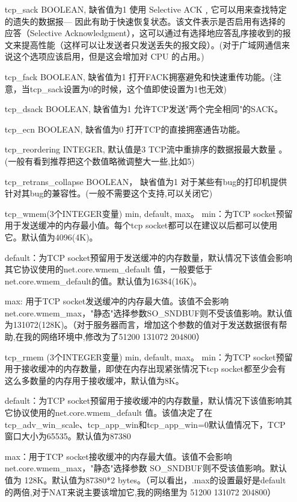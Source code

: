 \begin{enumerate}
\item[tcp\_sack] BOOLEAN,
缺省值为1
使用 Selective ACK﹐它可以用来查找特定的遗失的数据报--- 因此有助于快速恢复状态。该文件表示是否启用有选择的应答（Selective Acknowledgment），这可以通过有选择地应答乱序接收到的报文来提高性能（这样可以让发送者只发送丢失的报文段）。(对于广域网通信来说这个选项应该启用，但是这会增加对 CPU 的占用。)

\item[tcp\_fack] BOOLEAN,
缺省值为1
打开FACK拥塞避免和快速重传功能。(注意，当tcp\_sack设置为0的时候，这个值即使设置为1也无效)

\item[tcp\_dsack] BOOLEAN,
缺省值为1
允许TCP发送"两个完全相同"的SACK。

\item[tcp\_ecn] BOOLEAN,
缺省值为0
打开TCP的直接拥塞通告功能。

\item[tcp\_reordering] INTEGER,
默认值是3
TCP流中重排序的数据报最大数量 。 (一般有看到推荐把这个数值略微调整大一些,比如5)

\item[tcp\_retrans\_collapse] BOOLEAN，
缺省值为1
对于某些有bug的打印机提供针对其bug的兼容性。(一般不需要这个支持,可以关闭它)

\item[tcp\_wmem(3个INTEGER变量)] min, default, max。
min：为TCP socket预留用于发送缓冲的内存最小值。每个tcp socket都可以在建议以后都可以使用它。默认值为4096(4K)。

default：为TCP socket预留用于发送缓冲的内存数量，默认情况下该值会影响其它协议使用的net.core.wmem\_default 值，一般要低于net.core.wmem\_default的值。默认值为16384(16K)。

max: 用于TCP socket发送缓冲的内存最大值。该值不会影响net.core.wmem\_max，"静态"选择参数SO\_SNDBUF则不受该值影响。默认值为131072(128K)。（对于服务器而言，增加这个参数的值对于发送数据很有帮助,在我的网络环境中,修改为了51200 131072 204800）

\item[tcp\_rmem (3个INTEGER变量)] min, default, max。
min：为TCP socket预留用于接收缓冲的内存数量，即使在内存出现紧张情况下tcp socket都至少会有这么多数量的内存用于接收缓冲，默认值为8K。

default：为TCP socket预留用于接收缓冲的内存数量，默认情况下该值影响其它协议使用的net.core.wmem\_default 值。该值决定了在tcp\_adv\_win\_scale、tcp\_app\_win和tcp\_app\_win=0默认值情况下，TCP窗口大小为65535。默认值为87380

max：用于TCP socket接收缓冲的内存最大值。该值不会影响 net.core.wmem\_max，"静态"选择参数 SO\_SNDBUF则不受该值影响。默认值为 128K。默认值为87380*2 bytes。（可以看出，.max的设置最好是default的两倍,对于NAT来说主要该增加它,我的网络里为 51200 131072 204800）


\end{enumerate}
